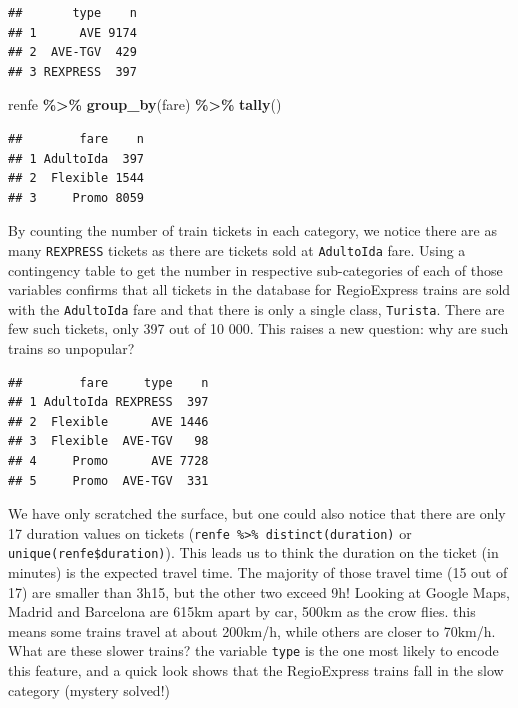 \documentclass[
  11pt,
  letterpaper,
]{book}
\newenvironment{Shaded}{\begin{snugshade}}{\end{snugshade}}
\newcommand{\KeywordTok}[1]{\textcolor[rgb]{0.13,0.29,0.53}{\textbf{#1}}}
\newcommand{\NormalTok}[1]{#1}
\newcommand{\OperatorTok}[1]{\textcolor[rgb]{0.81,0.36,0.00}{\textbf{#1}}}
\newcommand{\StringTok}[1]{\textcolor[rgb]{0.31,0.60,0.02}{#1}}
\theoremstyle{definition}
\theoremstyle{definition}
\theoremstyle{definition}
\theoremstyle{remark}
\begin{document}
\begin{verbatim}
##       type    n
## 1      AVE 9174
## 2  AVE-TGV  429
## 3 REXPRESS  397
\end{verbatim}

\begin{Shaded}
\begin{Highlighting}[]
\NormalTok{renfe }\OperatorTok{\%\textgreater{}\%}\StringTok{ }\KeywordTok{group\_by}\NormalTok{(fare) }\OperatorTok{\%\textgreater{}\%}\StringTok{ }\KeywordTok{tally}\NormalTok{()}
\end{Highlighting}
\end{Shaded}

\begin{verbatim}
##        fare    n
## 1 AdultoIda  397
## 2  Flexible 1544
## 3     Promo 8059
\end{verbatim}

By counting the number of train tickets in each category, we notice there are as many \texttt{REXPRESS} tickets as there are tickets sold at \texttt{AdultoIda} fare. Using a contingency table to get the number in respective sub-categories of each of those variables confirms that all tickets in the database for RegioExpress trains are sold with the \texttt{AdultoIda} fare and that there is only a single class, \texttt{Turista}. There are few such tickets, only 397 out of 10 000. This raises a new question: why are such trains so unpopular?

\begin{verbatim}
##        fare     type    n
## 1 AdultoIda REXPRESS  397
## 2  Flexible      AVE 1446
## 3  Flexible  AVE-TGV   98
## 4     Promo      AVE 7728
## 5     Promo  AVE-TGV  331
\end{verbatim}

We have only scratched the surface, but one could also notice that there are only 17 duration values on tickets (\texttt{renfe\ \%\textgreater{}\%\ distinct(duration)} or \texttt{unique(renfe\$duration)}). This leads us to think the duration on the ticket (in minutes) is the expected travel time. The majority of those travel time (15 out of 17) are smaller than 3h15, but the other two exceed 9h! Looking at Google Maps, Madrid and Barcelona are 615km apart by car, 500km as the crow flies. this means some trains travel at about 200km/h, while others are closer to 70km/h. What are these slower trains? the variable \texttt{type} is the one most likely to encode this feature, and a quick look shows that the RegioExpress trains fall in the slow category (mystery solved!)
\end{document}
